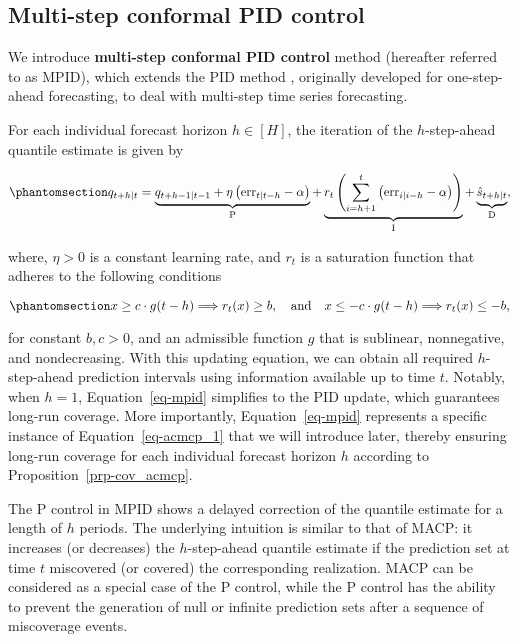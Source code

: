 \documentclass[
  11pt,
  a4paper,
]{article}
\theoremstyle{plain}
\theoremstyle{remark}
\begin{document}
\subsection{Multi-step conformal PID
control}\label{multi-step-conformal-pid-control}

We introduce \textbf{multi-step conformal PID control} method (hereafter
referred to as MPID), which extends the PID method
\autocite{angelopoulos2024}, originally developed for one-step-ahead
forecasting, to deal with multi-step time series forecasting.

For each individual forecast horizon \(h\in[H]\), the iteration of the
\(h\)-step-ahead quantile estimate is given by

\begin{equation}\phantomsection\label{eq-mpid}{
q_{t+h|t}=\underbrace{q_{t+h-1|t-1}+\eta \left(\mathrm{err}_{t|t-h}-\alpha\right)}_{\mathrm{P}}+\underbrace{r_t\left(\sum_{i=h+1}^t \left(\mathrm{err}_{i|i-h}-\alpha\right)\right)}_{\mathrm{I}}+\underbrace{\hat{s}_{t+h|t}}_{\mathrm{D}},
}\end{equation}

where, \(\eta > 0\) is a constant learning rate, and \(r_t\) is a
saturation function that adheres to the following conditions

\begin{equation}\phantomsection\label{eq-saturation_h}{
x \geq c \cdot g(t-h) \Longrightarrow r_t(x) \geq b, \quad \text {and} \quad x \leq-c \cdot g(t-h) \Longrightarrow r_t(x) \leq -b,
}\end{equation}

for constant \(b, c > 0\), and an admissible function \(g\) that is
sublinear, nonnegative, and nondecreasing. With this updating equation,
we can obtain all required \(h\)-step-ahead prediction intervals using
information available up to time \(t\). Notably, when \(h=1\),
Equation~\ref{eq-mpid} simplifies to the PID update, which guarantees
long-run coverage. More importantly, Equation~\ref{eq-mpid} represents a
specific instance of Equation~\ref{eq-acmcp_1} that we will introduce
later, thereby ensuring long-run coverage for each individual forecast
horizon \(h\) according to Proposition~\ref{prp-cov_acmcp}.

The P control in MPID shows a delayed correction of the quantile
estimate for a length of \(h\) periods. The underlying intuition is
similar to that of MACP: it increases (or decreases) the
\(h\)-step-ahead quantile estimate if the prediction set at time \(t\)
miscovered (or covered) the corresponding realization. MACP can be
considered as a special case of the P control, while the P control has
the ability to prevent the generation of null or infinite prediction
sets after a sequence of miscoverage events.
\end{document}
